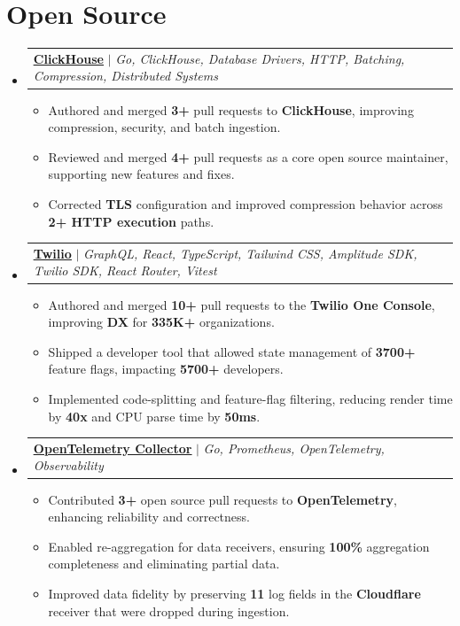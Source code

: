 \documentclass[letterpaper,11pt]{article}
\makeatletter
\newcommand{\resumeItem}[1]{
  \item\small{
    {#1 \vspace{-2pt}}
  }
}
\newcommand{\resumeProjectHeading}[2]{
    \item
    \begin{tabular*}{0.97\textwidth}{l@{\extracolsep{\fill}}r}
      \small#1\\
    \end{tabular*}\vspace{-7pt}
}
\newcommand{\resumeSubHeadingListStart}{\begin{itemize}[leftmargin=0.15in, label={}]}
\newcommand{\resumeSubHeadingListEnd}{\end{itemize}}
\newcommand{\resumeItemListStart}{\begin{itemize}}
\newcommand{\resumeItemListEnd}{\end{itemize}\vspace{-7pt}}
\makeatother
\begin{document}
\vspace*{-0.15in} %
\section{Open Source 
}
    \resumeSubHeadingListStart
      \resumeProjectHeading
        {\textbf{\href{https://github.com/ClickHouse/clickhouse-go}{\ul{ClickHouse}}} $|$ \emph{Go, ClickHouse, Database Drivers, HTTP, Batching, Compression, Distributed Systems}}{June 2021 -- Present}
          \resumeItemListStart
            \resumeItem{Authored and merged \textbf{3+} pull requests to \textbf{ClickHouse}, improving compression, security, and batch ingestion.}
            \resumeItem{Reviewed and merged \textbf{4+} pull requests as a core open source maintainer, supporting new features and fixes.}
            \resumeItem{Corrected \textbf{TLS} configuration and improved compression behavior across \textbf{2+ HTTP execution} paths.}
          \resumeItemListEnd
        \resumeProjectHeading
        {\textbf{\href{https://www.twilio.com/en-us}{\ul{Twilio}}} $|$ \emph{GraphQL, React, TypeScript, Tailwind CSS, Amplitude SDK, Twilio SDK, React Router, Vitest}}{June 2021 -- Present}
            \resumeItemListStart
            \resumeItem{Authored and merged \textbf{10+} pull requests to the \textbf{Twilio One Console}, improving \textbf{DX} for \textbf{335K+} organizations.}
            \resumeItem{Shipped a developer tool that allowed state management of \textbf{3700+} feature flags, impacting \textbf{5700+} developers.}
            \resumeItem{Implemented code-splitting and feature-flag filtering, reducing render time by \textbf{40x} and CPU parse time by \textbf{50ms}.}
        \resumeItemListEnd
      \resumeProjectHeading
        {\textbf{\href{https://github.com/open-telemetry/opentelemetry-collector-contrib}{\underline{OpenTelemetry Collector}}} $|$ \emph{Go, Prometheus, OpenTelemetry, Observability}}{June 2021 -- Present}
          \resumeItemListStart
            \resumeItem{Contributed \textbf{3+} open source pull requests to \textbf{OpenTelemetry}, enhancing reliability and correctness.}
            \resumeItem{Enabled re-aggregation for data receivers, ensuring \textbf{100\%} aggregation completeness and eliminating partial data.}
            \resumeItem{Improved data fidelity by preserving \textbf{11} log fields in the \textbf{Cloudflare} receiver that were dropped during ingestion.}
          \resumeItemListEnd
    \resumeSubHeadingListEnd
%
\end{document}

